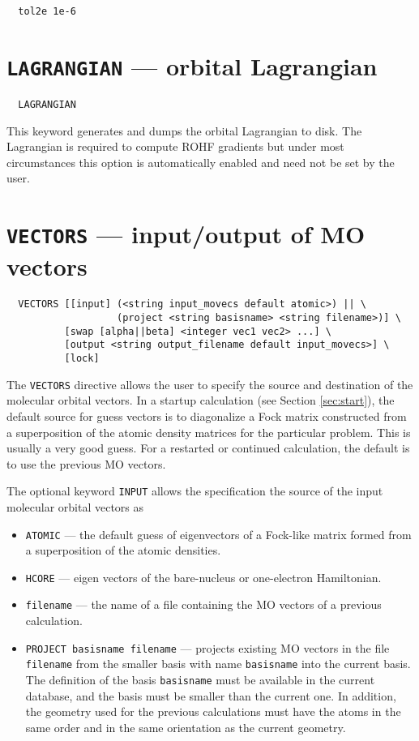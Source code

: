 \begin{verbatim}
  tol2e 1e-6
\end{verbatim}

\section{{\tt LAGRANGIAN} --- orbital Lagrangian}

\begin{verbatim}
  LAGRANGIAN
\end{verbatim}

This keyword generates and dumps the orbital Lagrangian to disk. The
Lagrangian is required to compute ROHF gradients but under most
circumstances this option is automatically enabled and need not be set
by the user.

\section{{\tt VECTORS} --- input/output of MO vectors}
\label{sec:vectors}


\begin{verbatim}
  VECTORS [[input] (<string input_movecs default atomic>) || \
                   (project <string basisname> <string filename>)] \
          [swap [alpha||beta] <integer vec1 vec2> ...] \
          [output <string output_filename default input_movecs>] \
          [lock]
\end{verbatim}

The \verb+VECTORS+ directive allows the user to specify the source and
destination of the molecular orbital vectors.  In a startup
calculation (see Section \ref{sec:start}), the default source for
guess vectors is to diagonalize a Fock matrix constructed from a
superposition of the atomic density matrices for the particular
problem.  This is usually a very good guess.  For a restarted or
continued calculation, the default is to use the previous MO vectors.

The optional keyword \verb+INPUT+ allows the specification the source
of the input molecular orbital vectors as
\begin{itemize}
\item \verb+ATOMIC+ --- the default guess of eigenvectors of a Fock-like
  matrix formed from a superposition of the atomic densities.
\item \verb+HCORE+ --- eigen vectors of the bare-nucleus or
  one-electron Hamiltonian.
\item \verb+filename+ --- the name of a file containing the MO
  vectors of a previous calculation.
\item \verb+PROJECT basisname filename+ --- projects existing MO
  vectors in the file \verb+filename+ from the smaller basis with name
  \verb+basisname+ into the current basis.  The definition of the
  basis \verb+basisname+ must be available in the current database,
  and the basis must be smaller than the current one.  In addition,
  the geometry used for the previous calculations must have the atoms
  in the same order and in the same orientation as the current
  geometry.
\end{itemize}
 
